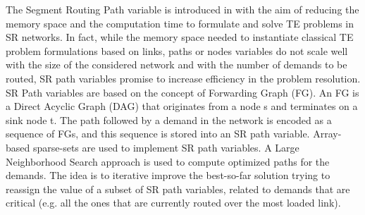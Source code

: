 The Segment Routing Path variable is introduced in \cite{defo2} with the aim of reducing the memory space and the computation time to formulate and solve TE problems in SR networks.
In fact, while the memory space needed to instantiate classical TE problem formulations based on links, paths or nodes variables do not scale well with the size of the considered network and with the number of demands to be routed, SR path variables promise to increase efficiency in the problem resolution.
SR Path variables are based on the concept of Forwarding Graph (FG).
An FG is a Direct Acyclic Graph (DAG) that originates from a node s and terminates on a sink node t.
The path followed by a demand in the network is encoded as a sequence of FGs, and this sequence is stored into an SR path variable.
Array-based sparse-sets are used to implement SR path variables.
A Large Neighborhood Search approach is used to compute optimized paths for the demands.
The idea is to iterative improve the best-so-far solution trying to reassign the value of a subset of SR path variables, related to demands that are critical (e.g. all the ones that are currently routed over the most loaded link).

